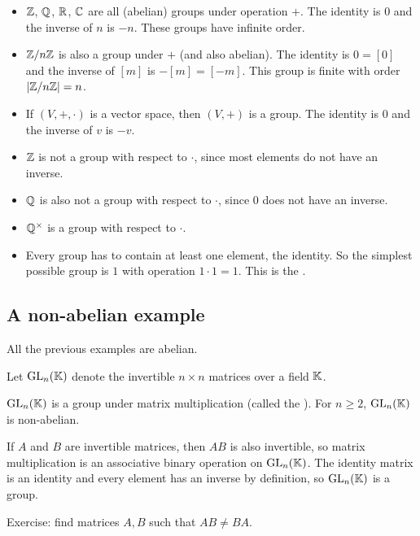 \documentclass[12pt,letterpaper]{report}
\begin{document}
\begin{ex}
  \begin{itemize}
    \item
    $\mathbb{Z}$, $\mathbb{Q}$, $\mathbb{R}$, $\mathbb{C}$ are all (abelian) groups under operation
    $+$.
    The identity is $0$ and the inverse of $n$ is $-n$.
    These groups have infinite order.
    \item
    $\mathbb{Z}/{n}\mathbb{Z}$ is also a group under $+$ (and also abelian).
    The identity is $0 = [0]$ and the inverse of $[m]$ is $-[m] = [-m]$.
    This group is finite with order $\lvert\mathbb{Z}/{n}\mathbb{Z}\rvert = n$.
    \item
    If $(V, +, \cdot)$ is a vector space, then $(V, +)$ is a group.
    The identity is $0$ and the inverse of $v$ is $-v$.
    \item
    $\mathbb{Z}$ is not a group with respect to $\cdot$, since most elements do not have an inverse.
    \item
    $\mathbb{Q}$ is also not a group with respect to $\cdot$, since $0$ does not have an inverse.
    \item
    $\mathbb{Q}^\times$ is a group with respect to $\cdot$.
    \item
    Every group has to contain at least one element, the identity.
    So the simplest possible group is ${1}$ with operation $1 \cdot 1 = 1$.
    This is the .
  \end{itemize}
\end{ex}

\pagebreak
\subsection{A non-abelian example}

All the previous examples are abelian.

Let $\operatorname{GL}_n(\mathbb{K})$ denote the invertible $n \times n$ matrices over a field $\mathbb{K}$.

\begin{prop}{}{}
  $\operatorname{GL}_n(\mathbb{K})$ is a group under matrix multiplication (called the
  ).
  For $n \geq 2$, $\operatorname{GL}_n(\mathbb{K})$ is non-abelian.
\end{prop}

\begin{thmproof}
  If $A$ and $B$ are invertible matrices, then $AB$ is also invertible, so matrix multiplication is
  an associative binary operation on $\operatorname{GL}_n(\mathbb{K})$.
  The identity matrix is an identity and every element has an inverse by definition, so
  $\operatorname{GL}_n(\mathbb{K})$ is a group.

  Exercise: find matrices $A, B$ such that $AB \neq BA$.
\end{thmproof}
\end{document}
